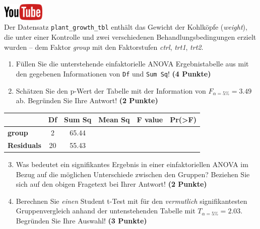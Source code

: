 \documentclass[a4paper, 10pt]{scrartcl}\usepackage[]{graphicx}\usepackage[]{xcolor}
\begin{document}
\hfill\href{https://youtu.be/49hvImMwVyE}{\includegraphics[width =
  2cm]{img/youtube}}\\[1Ex]


Der Datensatz \texttt{plant\_growth\_tbl} enth{\"a}lt das Gewicht der Kohlk{\"o}pfe
(\textit{weight}), die unter einer Kontrolle und zwei verschiedenen
Behandlungsbedingungen erzielt wurden -- dem Faktor \textit{group} mit den
Faktorstufen \textit{ctrl}, \textit{trt1}, \textit{trt2}.



\begin{enumerate}
\item F{\"u}llen Sie die unterstehende einfaktorielle ANOVA Ergebnistabelle aus
  mit den gegebenen Informationen von \texttt{Df} und \texttt{Sum Sq}!
  \textbf{(4 Punkte)}
\item Sch{\"a}tzen Sie den p-Wert der Tabelle mit der Information von
  $F_{\alpha = 5\%} = 3.49$ ab. Begr{\"u}nden Sie Ihre
  Antwort! \textbf{(2 Punkte)}
\end{enumerate}

\vspace{1Ex}

\begin{center}
  \Large
  \begin{tabular}{l|c|c|c|c|c}
     & \textbf{Df} & \textbf{Sum Sq} & \textbf{Mean Sq} & \textbf{F value} & \textbf{Pr(>F)} \strut\\
    \hline
   \textbf{group}  & 2 & 65.44 &  &  &  \strut\\
    \hline
   \textbf{Residuals}  & 20 & 55.43 &  &  &  \strut\\
  \end{tabular}
\end{center}

\vspace{1Ex}

\begin{enumerate}
  \setcounter{enumi}{2}
\item Was bedeutet ein signifikantes Ergebnis in einer einfaktoriellen
  ANOVA im Bezug auf die m{\"o}glichen Unterschiede zwischen den Gruppen? Beziehen Sie sich auf den obigen Fragetext bei Ihrer Antwort!
  \textbf{(2 Punkte)}
\item Berechnen Sie \textit{einen} Student t-Test mit f{\"u}r den \textit{vermutlich}
  signifikantesten Gruppenvergleich anhand der untenstehenden Tabelle mit
  $T_{\alpha = 5\%} = 2.03$. Begr{\"u}nden Sie Ihre Auswahl! \textbf{(3 Punkte)}
\end{enumerate}
\end{document}
